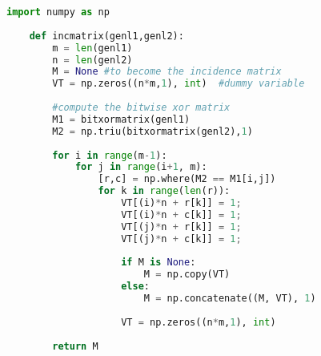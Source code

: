 \documentclass{article}
\begin{document}
\begin{lstlisting}[language=Python, caption=Python example]
    import numpy as np
        
    def incmatrix(genl1,genl2):
        m = len(genl1)
        n = len(genl2)
        M = None #to become the incidence matrix
        VT = np.zeros((n*m,1), int)  #dummy variable
        
        #compute the bitwise xor matrix
        M1 = bitxormatrix(genl1)
        M2 = np.triu(bitxormatrix(genl2),1) 
    
        for i in range(m-1):
            for j in range(i+1, m):
                [r,c] = np.where(M2 == M1[i,j])
                for k in range(len(r)):
                    VT[(i)*n + r[k]] = 1;
                    VT[(i)*n + c[k]] = 1;
                    VT[(j)*n + r[k]] = 1;
                    VT[(j)*n + c[k]] = 1;
                    
                    if M is None:
                        M = np.copy(VT)
                    else:
                        M = np.concatenate((M, VT), 1)
                    
                    VT = np.zeros((n*m,1), int)
        
        return M
    \end{lstlisting}

        
        
    
                    
                    
        
\end{document}
